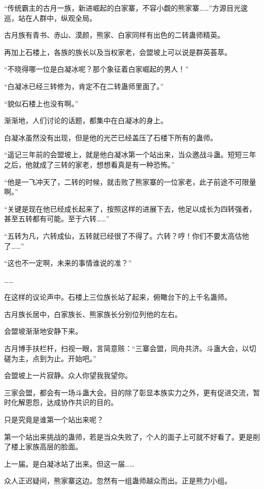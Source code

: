 
\begin{this_body}

“传统霸主的古月一族，新进崛起的白家寨，不容小觑的熊家寨……”方源目光逡巡，站在人群中，纵观全局。

古月族有青书、赤山、漠颜，熊家、白家同样有出色的二转蛊师精英。

再加上石楼上，各族的族长以及当权家老，会盟坡上可以说是群英荟萃。

“不晓得哪一位是白凝冰呢？那个象征着白家崛起的男人！”

“白凝冰已经三转修为，肯定不在二转蛊师里面了。”

“貌似石楼上也没有啊。”

渐渐地，人们讨论的话题，都集中在白凝冰的身上。

白凝冰虽然没有出现，但是他的光芒已经盖压了石楼下所有的蛊师。

“遥记三年前的会盟坡上，就是他白凝冰第一个站出来，当众邀战斗蛊。短短三年之后，他就成了三转的家老，想想看真是有一种恐怖。”

“他是一飞冲天了，二转的时候，就击败了熊家寨的一位家老，此子前途不可限量啊。”

“关键是现在他已经成长起来了，按照这样的进展下去，他足以成长为四转强者，甚至五转都有可能。至于六转……”

“五转为凡，六转成仙，五转就已经很了不得了。六转？哼！你们不要太高估他了……”

“这也不一定啊，未来的事情谁说的准？”

……

在这样的议论声中。石楼上三位族长站了起来，俯瞰台下的上千名蛊师。

古月族长居中，白家族长、熊家族长分别位列他的左右。

会盟坡渐渐地安静下来。

古月博手扶栏杆，扫视一眼，言简意赅：“三寨会盟，同舟共济。斗蛊大会，以切磋为主，点到为止。开始吧。”

会盟坡上一片寂静。众人你望我我望你。

三家会盟，都会有一场斗蛊大会。目的除了彰显本族实力之外，更有促进交流，暂时化解恩怨，达成协作共识的目的。

只是究竟是谁第一个站出来呢？

第一个站出来挑战的蛊师，若是当众失败了，个人的面子上可就不好看了。更是削了楼上家族高层的脸面。

上一届。是白凝冰站了出来。但这一届……

众人正迟疑间，熊家寨这边。忽然有一组蛊师越众而出。正是熊力小组。


\end{this_body}
